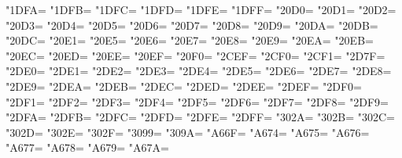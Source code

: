 \XeTeXcharclass"1DFA=\KclassCM
\XeTeXcharclass"1DFB=\KclassCM
\XeTeXcharclass"1DFC=\KclassCM
\XeTeXcharclass"1DFD=\KclassCM
\XeTeXcharclass"1DFE=\KclassCM
\XeTeXcharclass"1DFF=\KclassCM
\XeTeXcharclass"20D0=\KclassCM
\XeTeXcharclass"20D1=\KclassCM
\XeTeXcharclass"20D2=\KclassCM
\XeTeXcharclass"20D3=\KclassCM
\XeTeXcharclass"20D4=\KclassCM
\XeTeXcharclass"20D5=\KclassCM
\XeTeXcharclass"20D6=\KclassCM
\XeTeXcharclass"20D7=\KclassCM
\XeTeXcharclass"20D8=\KclassCM
\XeTeXcharclass"20D9=\KclassCM
\XeTeXcharclass"20DA=\KclassCM
\XeTeXcharclass"20DB=\KclassCM
\XeTeXcharclass"20DC=\KclassCM
\XeTeXcharclass"20E1=\KclassCM
\XeTeXcharclass"20E5=\KclassCM
\XeTeXcharclass"20E6=\KclassCM
\XeTeXcharclass"20E7=\KclassCM
\XeTeXcharclass"20E8=\KclassCM
\XeTeXcharclass"20E9=\KclassCM
\XeTeXcharclass"20EA=\KclassCM
\XeTeXcharclass"20EB=\KclassCM
\XeTeXcharclass"20EC=\KclassCM
\XeTeXcharclass"20ED=\KclassCM
\XeTeXcharclass"20EE=\KclassCM
\XeTeXcharclass"20EF=\KclassCM
\XeTeXcharclass"20F0=\KclassCM
\XeTeXcharclass"2CEF=\KclassCM
\XeTeXcharclass"2CF0=\KclassCM
\XeTeXcharclass"2CF1=\KclassCM
\XeTeXcharclass"2D7F=\KclassCM
\XeTeXcharclass"2DE0=\KclassCM
\XeTeXcharclass"2DE1=\KclassCM
\XeTeXcharclass"2DE2=\KclassCM
\XeTeXcharclass"2DE3=\KclassCM
\XeTeXcharclass"2DE4=\KclassCM
\XeTeXcharclass"2DE5=\KclassCM
\XeTeXcharclass"2DE6=\KclassCM
\XeTeXcharclass"2DE7=\KclassCM
\XeTeXcharclass"2DE8=\KclassCM
\XeTeXcharclass"2DE9=\KclassCM
\XeTeXcharclass"2DEA=\KclassCM
\XeTeXcharclass"2DEB=\KclassCM
\XeTeXcharclass"2DEC=\KclassCM
\XeTeXcharclass"2DED=\KclassCM
\XeTeXcharclass"2DEE=\KclassCM
\XeTeXcharclass"2DEF=\KclassCM
\XeTeXcharclass"2DF0=\KclassCM
\XeTeXcharclass"2DF1=\KclassCM
\XeTeXcharclass"2DF2=\KclassCM
\XeTeXcharclass"2DF3=\KclassCM
\XeTeXcharclass"2DF4=\KclassCM
\XeTeXcharclass"2DF5=\KclassCM
\XeTeXcharclass"2DF6=\KclassCM
\XeTeXcharclass"2DF7=\KclassCM
\XeTeXcharclass"2DF8=\KclassCM
\XeTeXcharclass"2DF9=\KclassCM
\XeTeXcharclass"2DFA=\KclassCM
\XeTeXcharclass"2DFB=\KclassCM
\XeTeXcharclass"2DFC=\KclassCM
\XeTeXcharclass"2DFD=\KclassCM
\XeTeXcharclass"2DFE=\KclassCM
\XeTeXcharclass"2DFF=\KclassCM
\XeTeXcharclass"302A=\KclassCM
\XeTeXcharclass"302B=\KclassCM
\XeTeXcharclass"302C=\KclassCM
\XeTeXcharclass"302D=\KclassCM
\XeTeXcharclass"302E=\KclassCM
\XeTeXcharclass"302F=\KclassCM
\XeTeXcharclass"3099=\KclassCM
\XeTeXcharclass"309A=\KclassCM
\XeTeXcharclass"A66F=\KclassCM
\XeTeXcharclass"A674=\KclassCM
\XeTeXcharclass"A675=\KclassCM
\XeTeXcharclass"A676=\KclassCM
\XeTeXcharclass"A677=\KclassCM
\XeTeXcharclass"A678=\KclassCM
\XeTeXcharclass"A679=\KclassCM
\XeTeXcharclass"A67A=\KclassCM

